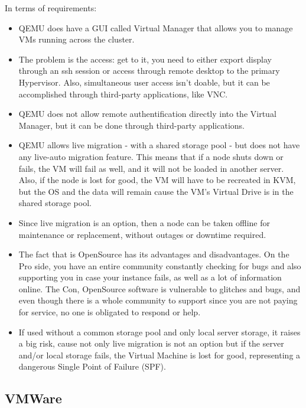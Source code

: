 In terms of requirements:

\begin{itemize}
  \item QEMU does have a GUI called Virtual Manager that allows you to manage VMs running across the cluster.
  \item The problem is the access: get to it, you need to either export display through an ssh session or access through remote desktop to the primary Hypervisor. Also, simultaneous user access isn't doable, but it can be accomplished through third-party applications, like VNC.
  \item QEMU does not allow remote authentification directly into the Virtual Manager, but it can be done through third-party applications.
  \item QEMU allows live migration - with a shared storage pool - but does not have any live-auto migration feature. This means that if a node shuts down or fails, the VM will fail as well, and it will not be loaded in another server. Also, if the node is lost for good, the VM will have to be recreated in KVM, but the OS and the data will remain cause the VM's Virtual Drive is in the shared storage pool.
  \item Since live migration is an option, then a node can be taken offline for maintenance or replacement, without outages or downtime required.
  \item The fact that is OpenSource has its advantages and disadvantages. On the Pro side, you have an entire community constantly checking for bugs and also supporting you in case your instance fails, as well as a lot of information online. The Con, OpenSource software is vulnerable to glitches and bugs, and even though there is a whole community to support since you are not paying for service, no one is obligated to respond or help.
  \item If used without a common storage pool and only local server storage, it raises a big risk, cause not only live migration is not an option but if the server and/or local storage fails, the Virtual Machine is lost for good, representing a dangerous Single Point of Failure (SPF).
\end{itemize}

\newpage
\subsection{VMWare}

